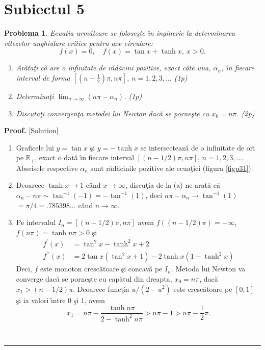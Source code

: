 \documentclass[12pt]{article}%
\newtheorem{problem}[theorem]{Problema}
\newenvironment{proof}[1][Proof]{\noindent\textbf{#1.} }{\ \rule{0.5em}{0.5em}}
\begin{document}
\section*{Subiectul 5}

\begin{problem}
\label{Gautschip4.31}Ecua\c{t}ia urm\u{a}toare se folose\c{s}te \^{\i}n
inginerie la determinarea vitezelor unghiulare critice pentru axe circulare:%
\[
f(x)=0,\quad f(x)=\tan x+\tanh x,~x>0.
\]


\begin{enumerate}
\item[(a)] Ar\u{a}ta\c{t}i c\u{a} are o infinitate de r\u{a}d\u{a}cini
pozitive, exact c\^{a}te una, $\alpha_{n}$, \^{\i}n fiecare interval de forma
$\left[  \left(  n-\frac{1}{2}\right)  \pi,n\pi\right]  $, $n=1,2,3,\dots$ (1p)

\item[(b)] Determina\c{t}i $\lim_{n\rightarrow\infty}\left(  n\pi-\alpha
_{n}\right)  $. (1p)

\item[(c)] Discuta\c{t}i convergen\c{t}a metodei lui Newton dac\u{a} se
porne\c{s}te cu $x_{0}=n\pi$. (2p)
\end{enumerate}
\end{problem}

\begin{proof}
[Solution]

\begin{enumerate}
\item[(a)] Graficele lui  $y=\tan x$ \c{s}i $y=-\tanh x$  se intersecteaz\u{a}
de o infinitate de ori pe $\mathbb{R}_{+}$, exact o dat\u{a} \^{\i}n fiecare
interval $[(n-1/2)\pi,n\pi]$, $n=1,2,3,\dots$. Abscisele respective
$\alpha_{n}$ sunt r\u{a}d\u{a}cinile pozitive ale ecua\c{t}iei (figura
\ref{figp31}).

\item[(b)] Deoarece $\tanh x\rightarrow1$ c\^{a}nd $x\rightarrow\infty$,
discu\c{t}ia de la (a) ne arat\u{a} c\u{a}  $\alpha_{n}-n\pi\sim\tan
^{-1}(-1)=-\tan^{-1}(1)$, deci $n\pi-\alpha_{n}\rightarrow\tan^{-1}(1)$
$=\pi/4=.785398\dots$ c\^{a}nd $n\rightarrow\infty$.

\item[(c)] Pe intervalul $I_{n}=\left[  (n-1/2)\pi,n\pi\right]  $ avem
$f\left(  (n-1/2)\pi\right)  =-\infty$, $f(n\pi)=\tanh n\pi>0$ \c{s}i%
\begin{align*}
f^{\prime}(x) &  =\tan^{2}x-\tanh^{2}x+2\\
f^{\prime\prime}(x) &  =2\tan x\left(  \tan^{2}x+1\right)  -2\tanh x\left(
1-\tanh^{2}x\right)
\end{align*}
Deci, $f$ este monoton cresc\u{a}toare \c{s}i concav\u{a} pe $I_{n}$. Metoda
lui Newton va converge dac\u{a} se porne\c{s}te cu cap\u{a}tul din dreapta,
$x_{0}=n\pi$, dac\u{a} $x_{1}>(n-1/2)\pi$. Deoarece func\c{t}ia $u/(2-u^{2})$
este cresc\u{a}toare pe $[0,1]$ \c{s}i ia valori \^{\i}ntre 0 \c{s}i 1, avem%
\[
x_{1}=n\pi-\frac{\tanh n\pi}{2-\tanh^{2}n\pi}>n\pi-1>n\pi-\frac{1}{2}\pi.
\]

\end{enumerate}
\end{proof}
\end{document}
